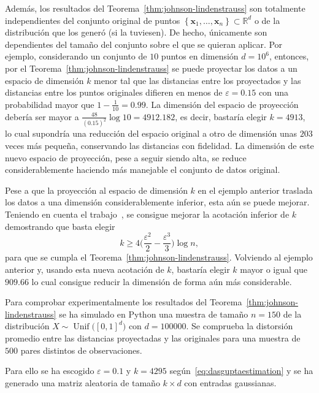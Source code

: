 Además, los resultados del Teorema~\ref{thm:johnson-lindenstrauss}
son totalmente independientes del conjunto original de puntos
$\left\{\symbf{x}_{1},\dotsc,\symbf{x}_{n}\right\}\subset\mathbb{R}^{d}$
o de la distribución que los generó (si la tuviesen).
De hecho, únicamente son dependientes del tamaño del conjunto sobre
el que se quieran aplicar.
Por ejemplo, considerando un conjunto de $10$ puntos en dimensión $d=10^{6}$,
entonces, por el Teorema~\ref{thm:johnson-lindenstrauss} se puede
proyectar los datos a un espacio de dimensión $k$ menor tal que las
distancias entre los proyectados y las distancias entre los puntos
originales difieren en menos de $\varepsilon=0.15$ con una probabilidad
mayor que $1-\frac{1}{10}=0.99$.
La dimensión del espacio de proyección debería ser mayor a
$\frac{48}{\left(0.15\right)^{2}}\log 10=4912.182$, es decir,
bastaría elegir $k=4913$, lo cual supondría una reducción del
espacio original a otro de dimensión unas $203$ veces más pequeña,
conservando las distancias con fidelidad.
La dimensión de este nuevo espacio de proyección, pese a seguir
siendo alta, se reduce considerablemente haciendo más manejable el
conjunto de datos original.

Pese a que la proyección al espacio de dimensión $k$ en el ejemplo anterior
traslada los datos a una dimensión considerablemente inferior, esta aún se puede mejorar.
Teniendo en cuenta el trabajo~\cite{Dasgupta2003}, se consigue mejorar la acotación inferior de $k$
demostrando que basta elegir
\begin{equation}\label{eq:dasguptaestimation}
	k\geq
	4
	\Big(
	\frac{\varepsilon^{2}}{2}-
	\frac{\varepsilon^{3}}{3}
	\Big)
	\log n,
\end{equation}
para que se cumpla el Teorema~\ref{thm:johnson-lindenstrauss}.
Volviendo al ejemplo anterior y, usando esta nueva acotación de $k$,
bastaría elegir $k$ mayor o igual que $909.66$ lo cual consigue reducir la
dimensión de forma aún más considerable.

Para comprobar experimentalmente los resultados del
Teorema~\ref{thm:johnson-lindenstrauss} se ha simulado en Python
una muestra de tamaño $n=150$ de la distribución
$X\sim\operatorname{Unif}\big({\left[0,1\right]}^{d}\big)$
con $d=100000$.
Se comprueba la distorsión promedio entre las distancias proyectadas
y las originales para una muestra de $500$ pares distintos de observaciones.

Para ello se ha escogido $\varepsilon=0.1$ y $k=4295$ según~\eqref{eq:dasguptaestimation}
y se ha generado una matriz aleatoria de tamaño $k\times d$ con
entradas gaussianas.

